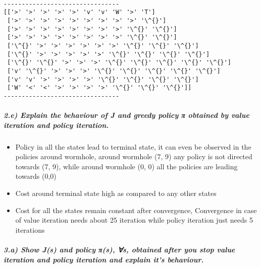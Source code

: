 \documentclass[11pt]{article}
\providecommand{\tightlist}{%
      \setlength{\itemsep}{0pt}\setlength{\parskip}{0pt}}
\begin{document}
    \begin{center}
    \end{center}
    { \hspace*{\fill} \\}
    
    \begin{Verbatim}[commandchars=\\\{\}]
--------------------------------
[['>' '>' '>' '>' '>' 'v' 'v' 'W' '>' 'T']
 ['>' '>' '>' '>' '>' '>' '>' '>' '>' '\^{}']
 ['>' '>' '>' '>' '>' '>' '>' '>' '\^{}' '\^{}']
 ['>' '>' '>' '>' '>' '>' '>' '>' '\^{}' '\^{}']
 ['\^{}' '>' '>' '>' '>' '>' '>' '\^{}' '\^{}' '\^{}']
 ['\^{}' '>' '>' '>' '>' '>' '\^{}' '\^{}' '\^{}' '\^{}']
 ['\^{}' '\^{}' '>' '>' '>' '\^{}' '\^{}' '\^{}' '\^{}' '\^{}']
 ['v' '\^{}' '>' '>' '>' '\^{}' '\^{}' '\^{}' '\^{}' '\^{}']
 ['v' 'v' '>' '>' '>' '>' '\^{}' '\^{}' '\^{}' '\^{}']
 ['W' '<' '<' '>' '>' '>' '>' '\^{}' '\^{}' '\^{}']]
--------------------------------

    \end{Verbatim}

    \subparagraph{2.e) Explain the behaviour of J and greedy policy π
obtained by value iteration and policy
iteration.}\label{e-explain-the-behaviour-of-j-and-greedy-policy-ux3c0-obtained-by-value-iteration-and-policy-iteration.}

\begin{itemize}
\tightlist
\item
  Policy in all the states lead to terminal state, it can even be
  observed in the policies around wormhole, around wormhole (7, 9) any
  policy is not directed towards (7, 9), while around wormhole (0, 0)
  all the policies are leading towards (0,0)\\
\item
  Cost around terminal state high as compared to any other states
\item
  Cost for all the states remain constant after convergence, Convergence
  in case of value iteration needs about 25 iteration while policy
  iteration just needs 5 iterations
\end{itemize}

    \subparagraph{3.a) Show J(s) and policy π(s), ∀s, obtained after you
stop value iteration and policy iteration and explain it's
behaviour.}\label{a-show-js-and-policy-ux3c0s-s-obtained-after-you-stop-value-iteration-and-policy-iteration-and-explain-its-behaviour.}
\end{document}
